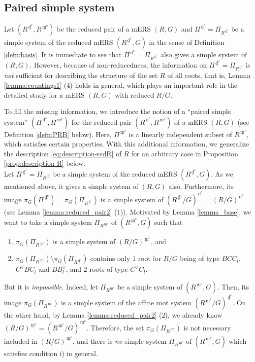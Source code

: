 \documentclass[11pt]{amsart}
\newcommand{\dc}{\,\underline{\mathrm{d}}^c}
\newcommand{\mc}{\, \underline{\mathrm{m}}^c}
\begin{document}
{\subsection{Paired simple system}\label{sect_PRB}
Let $(R^{\dc},R^{\mc})$ be the reduced pair of a mERS $(R,G)$ and 
$\Pi^{\dc}=\Pi_{R^{\dc}}$ be a simple system of 
the reduced mERS $(R^{\dc},G)$ in the sense of Definition \ref{defn:basis}. It is immediate
to see that $\Pi^{\dc}=\Pi_{R^{\dc}}$ also gives a simple system of $(R,G)$. 
However, because of 
non-reducedness, the information on $\Pi^{\dc}=\Pi_{R^{\dc}}$ is {\it not} sufficient for describing 
the structure of the set $R$ of all roots, that is,  Lemma 
\ref{lemma:countings1} {\rm (4)} {holds} in general, 
which plays an important role 
in the detailed study for a mERS $(R,G)$ with reduced $R/G$.

To fill the missing information, 
we introduce the notion of a ``paired simple system'' $(\Pi^{\dc},\Pi^{\mc})$ for
the reduced pair $(R^{\dc},R^{\mc})$ of a mERS $(R,G)$ (see Definition
\ref{defn:PRB} below). Here, $\Pi^{\mc}$ 
is a linearly independent 
subset of $R^{\mc}$, which satisfies certain properties.
With this additional information, we generalize  the description 
\eqref{eq:description-redR} of $R$ for an arbitrary case in Proposition 
\ref{prop:description-R} below. \\

Let $\Pi^{\dc}=\Pi_{R^{\dc}}$ be a simple system of the reduced mERS $(R^{\dc},G)$. 
As we mentioned above, it gives a simple system of $(R,G)$ also. 
Furthermore, its image 
$\pi_G(\Pi^{\dc})=\pi_G(\Pi_{R^{\dc}})$ is a simple system of 
$(R^{\dc}/G)^{\dc}=(R/G)^{\dc}$ (see Lemma \ref{lemma:reduced_pair2} (1)). 
Motivated by Lemma \ref{lemma_base}, we want to 
take a simple system $\Pi_{R^{\mc}}$ of $(R^{\mc},G)$ such that 
\begin{enumerate}
\item[i)] $\pi_G(\Pi_{R^{\mc}})$ is a simple system of $(R/G)^{\mc}$, and 
\item[ii)] $\pi_G(\Pi_{R^{\mc}})\setminus \pi_G(\Pi_{R^{\dc}})$ contains only 1 root for 
$R/G$ being of type $BCC_l$, $C^\vee BC_l$ and $BB^\vee_l$, and 2 roots 
of type $C^\vee C_l$. 
\end{enumerate}
But it is {\it impossible}. 
Indeed, let $\Pi_{R^{\mc}}$ be a simple system of $(R^{\mc},G)$. 
Then, its image $\pi_G(\Pi_{R^{\mc}})$ is a simple system of the affine root system
$(R^{\mc}/G)^{\dc}$. On the other hand, by Lemma \ref{lemma:reduced_pair2} (2), 
we already know $(R/G)^{\mc}=(R^{\mc}/G)^{\mc}$. Therefore, the set 
$\pi_G(\Pi_{R^{\mc}})$ is not necessary included in $(R/G)^{\mc}$, and there is {\it no}
simple system $\Pi_{R^{\mc}}$ of $(R^{\mc},G)$ which satisfies condition i) in general.

}
\end{document}
